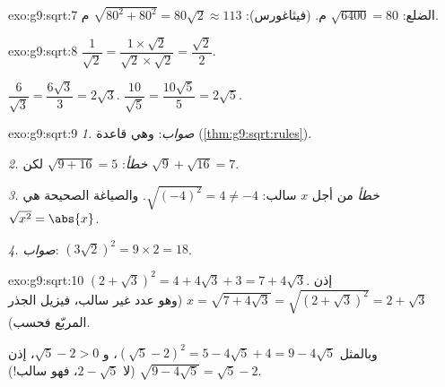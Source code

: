 \begin{solution}{exo:g9:sqrt:7}
الضلع: $\sqrt{6400} = 80$ م.  (فيثاغورس):
$\sqrt{80^2 + 80^2} = 80\sqrt2 \approx 113$ م.
\end{solution}

\begin{solution}{exo:g9:sqrt:8}
$\dfrac{1}{\sqrt2} = \dfrac{1 \times \sqrt2}{\sqrt2 \times \sqrt2}
= \dfrac{\sqrt2}{2}$.

$\dfrac{6}{\sqrt3} = \dfrac{6\sqrt3}{3} = 2\sqrt3$.
\quad
$\dfrac{10}{\sqrt5} = \dfrac{10\sqrt5}{5} = 2\sqrt5$.
\end{solution}

\begin{solution}{exo:g9:sqrt:9}
\emph{1. صواب}: وهي قاعدة  (\cref{thm:g9:sqrt:rules}).

\emph{2. خطأ}: $\sqrt{9 + 16} = 5$ لكن $\sqrt9 + \sqrt{16} = 7$.

\emph{3. خطأ} من أجل $x$ سالب: $\sqrt{(-4)^2} = 4 \neq -4$.
والصياغة الصحيحة هي $\sqrt{x^2} = \abs{x}$.

\emph{4. صواب}: $\left(3\sqrt2\right)^2 = 9 \times 2 = 18$.
\end{solution}

\begin{solution}{exo:g9:sqrt:10}
$\left(2 + \sqrt3\right)^2 = 4 + 4\sqrt3 + 3 = 7 + 4\sqrt3$. إذن
$x = \sqrt{7 + 4\sqrt3} = \sqrt{\left(2+\sqrt3\right)^2} = 2 + \sqrt3$
(وهو عدد غير سالب، فيزيل الجذر المربّع فحسب).

وبالمثل $\left(\sqrt5 - 2\right)^2 = 5 - 4\sqrt5 + 4 = 9 - 4\sqrt5$،
و $\sqrt5 - 2 > 0$، إذن
$\sqrt{9 - 4\sqrt5} = \sqrt5 - 2$ (لا $2 - \sqrt5$، فهو
سالب!).
\end{solution}

